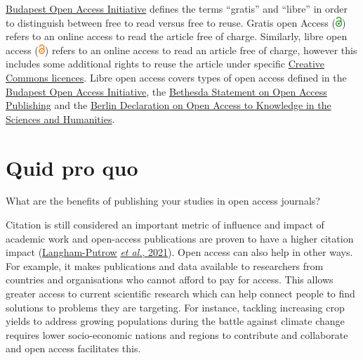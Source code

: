 \documentclass[
]{book}
\begin{document}
\href{https://www.budapestopenaccessinitiative.org/}{Budapest Open Access Initiative} defines the terms ``gratis'' and ``libre'' in order to distinguish between free to read versus free to reuse. Gratis open Access (\includegraphics[width=0.09375in,height=0.14583in]{images/paste-9AC8E881.png}) refers to an online access to read the article free of charge. Similarly, libre open access (\includegraphics{images/image2.png}) refers to an online access to read an article free of charge, however this includes some additional rights to reuse the article under specific \href{https://en.wikipedia.org/wiki/Creative_Commons_license}{Creative Commons licences}. Libre open access covers types of open access defined in the \href{https://en.wikipedia.org/wiki/Budapest_Open_Access_Initiative}{Budapest Open Access Initiative}, the \href{https://en.wikipedia.org/wiki/Bethesda_Statement_on_Open_Access_Publishing}{Bethesda Statement on Open Access Publishing} and the \href{https://en.wikipedia.org/wiki/Berlin_Declaration_on_Open_Access_to_Knowledge_in_the_Sciences_and_Humanities}{Berlin Declaration on Open Access to Knowledge in the Sciences and Humanities}.

\hypertarget{quid-pro-quo}{%
\section{Quid pro quo}\label{quid-pro-quo}}

What are the benefits of publishing your studies in open access journals?

Citation is still considered an important metric of influence and impact of academic work and open-access publications are proven to have a higher citation impact (\href{https://journals.plos.org/plosone/article?id=10.1371/journal.pone.0253129}{Langham-Putrow} \href{https://journals.plos.org/plosone/article?id=10.1371/journal.pone.0253129}{\emph{et al.}, 2021}). Open access can also help in other ways. For example, it makes publications and data available to researchers from countries and organisations who cannot afford to pay for access. This allows greater access to current scientific research which can help connect people to find solutions to problems they are targeting. For instance, tackling increasing crop yields to address growing populations during the battle against climate change requires lower socio-economic nations and regions to contribute and collaborate and open access facilitates this.
\end{document}
